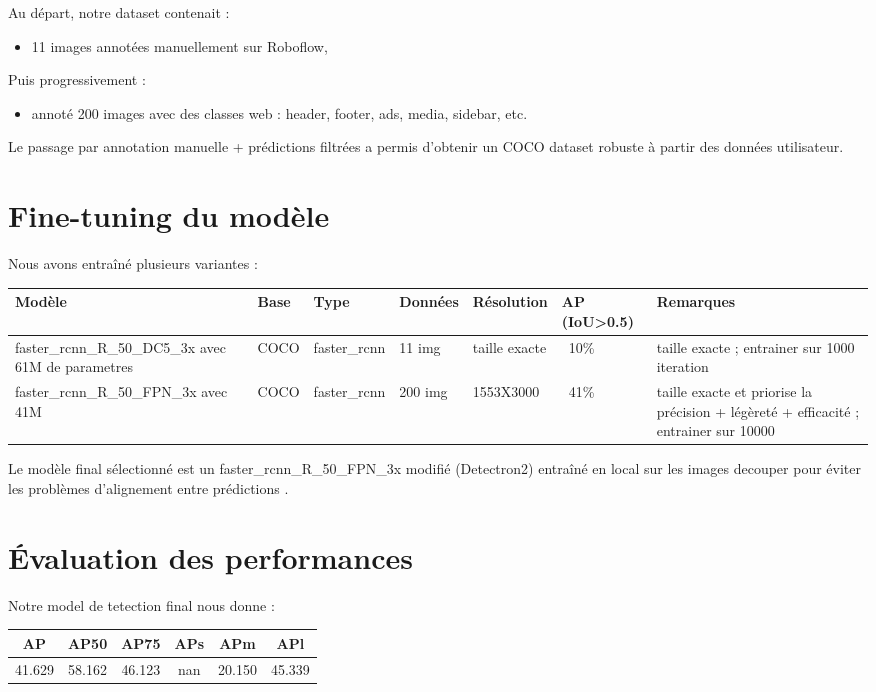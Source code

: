\documentclass[12pt,a4paper]{report}
\begin{document}
Au départ, notre dataset contenait :
\begin{itemize}
\item 11 images annotées manuellement sur Roboflow,
\end{itemize}

Puis progressivement :
\begin{itemize}
\item annoté 200 images avec des classes web : header, footer, ads, media, sidebar, etc.
\end{itemize}

Le passage par annotation manuelle + prédictions filtrées a permis d'obtenir un COCO dataset robuste à partir des données utilisateur.

\section{Fine-tuning du modèle}

Nous avons entraîné plusieurs variantes :

\begin{longtable}{|p{2.5cm}|p{1.5cm}|p{2cm}|p{1.5cm}|p{2cm}|p{1.5cm}|p{3cm}|}
\hline
\textbf{Modèle} & \textbf{Base} & \textbf{Type} & \textbf{Données} & \textbf{Résolution} & \textbf{AP (IoU>0.5)} & \textbf{Remarques} \\
\hline
faster_rcnn_R_50_DC5_3x avec 61M de parametres & COCO & faster_rcnn & 11 img & taille exacte  & ~10\% & taille exacte ; entrainer sur 1000 iteration \\
\hline
faster_rcnn_R_50_FPN_3x avec 41M  & COCO  & faster_rcnn & 200 img & 1553X3000 & ~41\% & taille exacte et priorise la précision + légèreté + efficacité ; entrainer sur 10000 \\

\hline
\end{longtable}

Le modèle final sélectionné est un faster_rcnn_R_50_FPN_3x modifié (Detectron2) entraîné en local sur les images decouper pour éviter les problèmes d'alignement entre prédictions .

\section{Évaluation des performances}

Notre model de tetection final  nous donne  : \\

\begin{center}
\begin{tabular}{cccccc}
\toprule
\textbf{AP} & \textbf{AP50} & \textbf{AP75} & \textbf{APs} & \textbf{APm} & \textbf{APl} \\
\midrule
41.629 & 58.162 & 46.123 & nan & 20.150 & 45.339 \\
\bottomrule
\end{tabular}
\end{center}
\end{document}

